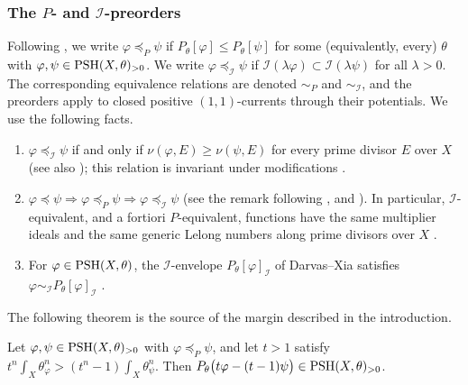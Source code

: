 \documentclass[11pt,a4paper]{amsart}
\newcommand{\lessing}{\preceq}                   %
\newcommand{\lessP}{\preceq_{P}}
\newcommand{\lessI}{\preceq_{\mathcal I}}
\newcommand{\simP}{\sim_{P}}
\newcommand{\simI}{\sim_{\mathcal I}}
\theoremstyle{definition}
\begin{document}
\subsubsection*{The \texorpdfstring{$P$}{P}- and
\texorpdfstring{$\mathcal I$}{I}-preorders}
Following \cite[Definition~6.1.1]{XiaSGPT}, we write $\varphi\lessP\psi$
if $P_\theta[\varphi]\le P_\theta[\psi]$ for some (equivalently, every)
$\theta$ with $\varphi,\psi\in\mathrm{PSH}(X,\theta)_{>0}$. We write
$\varphi\lessI\psi$ if
$\mathcal I(\lambda\varphi)\subset\mathcal I(\lambda\psi)$ for all
$\lambda>0$. The corresponding equivalence relations are denoted
$\simP$ and $\simI$, and the preorders apply to closed positive
$(1,1)$-currents through their potentials. We use the following facts.
\begin{enumerate}[label=(\alph*),leftmargin=*,itemsep=.2em,topsep=.3em,resume]
\item\label{it:I-valuative} $\varphi\lessI\psi$ if and only if
  $\nu(\varphi,E)\ge\nu(\psi,E)$ for every prime divisor $E$ over $X$
  \cite[Proposition~6.1.2]{XiaSGPT} (see also \cite{BFJ08}); this
  relation is invariant under modifications
  \cite[Lemma~6.1.4]{XiaSGPT}.
\item\label{it:orders} $\varphi\lessing\psi\Rightarrow\varphi\lessP\psi
  \Rightarrow\varphi\lessI\psi$ (see the remark following
  \cite[Definition~6.1.1]{XiaSGPT}, and
  \cite[Corollary~6.1.1]{XiaSGPT}). In particular, $\mathcal I$-equivalent,
  and a fortiori $P$-equivalent, functions have the same multiplier ideals
  and the same generic Lelong numbers along prime divisors over $X$
  \cite[Proposition~3.2.1]{XiaSGPT}.
\item\label{it:I-envelope} For $\varphi\in\mathrm{PSH}(X,\theta)$, the
  $\mathcal I$-envelope $P_\theta[\varphi]_{\mathcal I}$ of Darvas--Xia
  \cite{DX22} satisfies $\varphi\simI P_\theta[\varphi]_\mathcal I$
  \cite[Proposition~3.2.6]{XiaSGPT}.
\end{enumerate}

The following theorem is the source of the margin described in the
introduction.

\begin{theorem}\label{thm:rooftop}
Let $\varphi,\psi\in\mathrm{PSH}(X,\theta)_{>0}$ with $\varphi\lessP\psi$, and
let $t>1$ satisfy
$t^n\int_X\theta_\varphi^n>(t^n-1)\int_X\theta_\psi^n$. Then
$P_\theta\bigl(t\varphi-(t-1)\psi\bigr)\in\mathrm{PSH}(X,\theta)_{>0}$.
\end{theorem}
\end{document}
